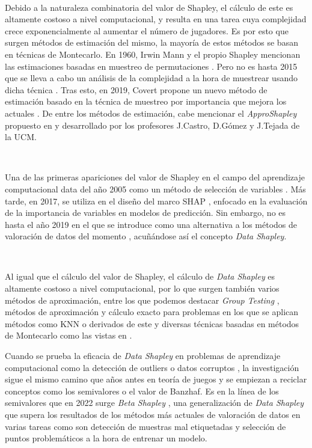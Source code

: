 \

Debido a la naturaleza combinatoria del valor de Shapley, el cálculo
de este es altamente costoso a nivel computacional, y resulta en una
tarea cuya complejidad crece exponencialmente al aumentar el
número de jugadores. Es por esto que surgen métodos de estimación del
mismo, la mayoría de estos métodos se basan en técnicas de Montecarlo.
En 1960, Irwin Mann y el propio Shapley mencionan las estimaciones
basadas en muestreo de permutaciones \cite{permutationSampling}. Pero
no es hasta 2015 que se lleva a cabo un análisis de la complejidad
a la hora de muestrear usando dicha técnica \cite{maleki}.
Tras esto, en 2019, Covert propone un nuevo método de estimación basado
en la técnica de muestreo por importancia que mejora los actuales
\cite{covert}. De entre los métodos de estimación, cabe mencionar
el \textit{ApproShapley} propuesto en
{\cite{Tejada}} y desarrollado por los profesores J.Castro,
D.Gómez y J.Tejada de la UCM.

\

Una de las primeras apariciones del valor de Shapley en el campo
del aprendizaje computacional data del año 2005 como un método de
selección de variables \cite{featureSelection}. Más tarde, en
2017, se utiliza en el diseño del marco SHAP \cite{featureImportance},
enfocado en la evaluación de la importancia de variables en modelos de
predicción. Sin embargo, no es hasta el año 2019 en el que se introduce
como una alternativa a los métodos de valoración de datos del
momento \cite{dataShapley}, acuñándose así el concepto 
\textit{Data Shapley}.

\

Al igual que el cálculo del valor de Shapley, el cálculo de
\textit{Data Shapley} es altamente costoso a nivel computacional,
por lo que surgen también varios métodos de aproximación, entre
los que podemos destacar \textit{Group Testing} \cite{looFuck},
métodos de aproximación y cálculo exacto para problemas en los
que se aplican métodos como KNN o derivados de este \cite{knn} y
diversas técnicas basadas en métodos de Montecarlo como las vistas
en \cite{dataShapley}.

Cuando se prueba la eficacia de \textit{Data Shapley} en problemas de
aprendizaje computacional como la detección de outliers o datos corruptos
{\cite{dataShapley}}, la investigación sigue el mismo camino que años
antes en teoría de juegos y se empiezan a reciclar conceptos como los
semivalores o el valor de Banzhaf. Es en la línea de los semivalores que
en 2022 surge \textit{Beta Shapley} {\cite{betaShapley}}, una
generalización de \textit{Data Shapley} que supera los
resultados de los métodos más actuales de valoración de datos
en varias tareas como son detección de muestras mal etiquetadas
y selección de puntos problemáticos a la hora de entrenar un modelo.

